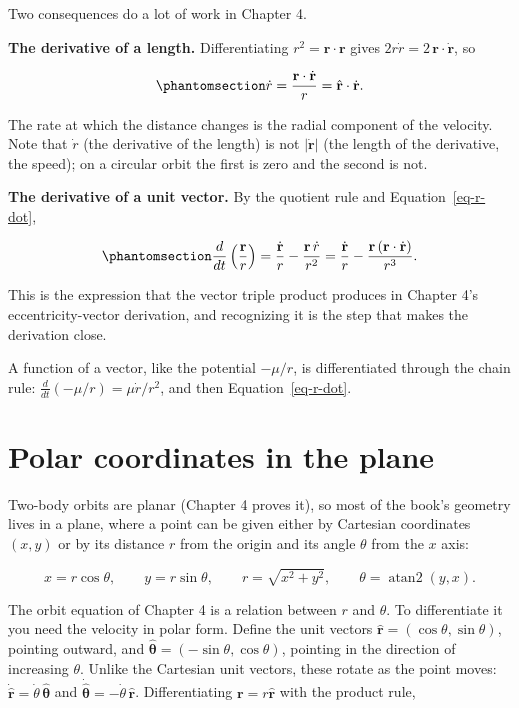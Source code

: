 \documentclass[
  10.5pt,
  letterpaper,
]{scrbook}
\theoremstyle{definition}
\theoremstyle{plain}
\theoremstyle{remark}
\begin{document}
Two consequences do a lot of work in Chapter 4.

\textbf{The derivative of a length.} Differentiating
\(r^2 = \mathbf{r}\cdot\mathbf{r}\) gives
\(2r\dot r = 2\,\mathbf{r}\cdot\dot{\mathbf{r}}\), so

\begin{equation}\protect\phantomsection\label{eq-r-dot}{
\dot r = \frac{\mathbf{r}\cdot\dot{\mathbf{r}}}{r} = \hat{\mathbf{r}}\cdot\dot{\mathbf{r}}.
}\end{equation}

The rate at which the distance changes is the radial component of the
velocity. Note that \(\dot r\) (the derivative of the length) is not
\(|\dot{\mathbf{r}}|\) (the length of the derivative, the speed); on a
circular orbit the first is zero and the second is not.

\textbf{The derivative of a unit vector.} By the quotient rule and
Equation~\ref{eq-r-dot},

\begin{equation}\protect\phantomsection\label{eq-unit-vector-dot}{
\frac{d}{dt}\left(\frac{\mathbf{r}}{r}\right) = \frac{\dot{\mathbf{r}}}{r} - \frac{\mathbf{r}\,\dot r}{r^2} = \frac{\dot{\mathbf{r}}}{r} - \frac{\mathbf{r}\,(\mathbf{r}\cdot\dot{\mathbf{r}})}{r^3}.
}\end{equation}

This is the expression that the vector triple product produces in
Chapter 4's eccentricity-vector derivation, and recognizing it is the
step that makes the derivation close.

A function of a vector, like the potential \(-\mu/r\), is differentiated
through the chain rule: \(\frac{d}{dt}(-\mu/r) = \mu\dot r/r^2\), and
then Equation~\ref{eq-r-dot}.

\section{Polar coordinates in the
plane}\label{polar-coordinates-in-the-plane}

Two-body orbits are planar (Chapter 4 proves it), so most of the book's
geometry lives in a plane, where a point can be given either by
Cartesian coordinates \((x, y)\) or by its distance \(r\) from the
origin and its angle \(\theta\) from the \(x\) axis:

\[
x = r\cos\theta, \qquad y = r\sin\theta, \qquad r = \sqrt{x^2+y^2}, \qquad \theta = \operatorname{atan2}(y, x).
\]

The orbit equation of Chapter 4 is a relation between \(r\) and
\(\theta\). To differentiate it you need the velocity in polar form.
Define the unit vectors \(\hat{\mathbf{r}} = (\cos\theta, \sin\theta)\),
pointing outward, and
\(\hat{\boldsymbol{\theta}} = (-\sin\theta, \cos\theta)\), pointing in
the direction of increasing \(\theta\). Unlike the Cartesian unit
vectors, these rotate as the point moves:
\(\dot{\hat{\mathbf{r}}} = \dot\theta\,\hat{\boldsymbol{\theta}}\) and
\(\dot{\hat{\boldsymbol{\theta}}} = -\dot\theta\,\hat{\mathbf{r}}\).
Differentiating \(\mathbf{r} = r\hat{\mathbf{r}}\) with the product
rule,
\end{document}
